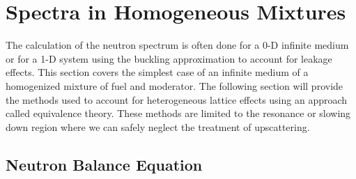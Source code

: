 \section{Spectra in Homogeneous Mixtures}

The calculation of the neutron spectrum is often done for a 0-D infinite medium or for a 1-D system using the buckling approximation to account for leakage effects. This section covers the simplest case of an infinite medium of a homogenized mixture of fuel and moderator. The following section will provide the methods used to account for heterogeneous lattice effects using an approach called equivalence theory. These methods are limited to the resonance or slowing down region where we can safely neglect the treatment of upscattering.

\subsection{Neutron Balance Equation}

